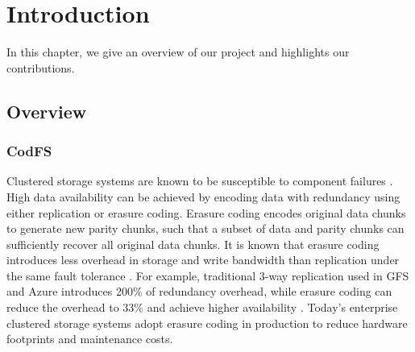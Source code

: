 \chapter{Introduction}
\label{sec:introduction}

In this chapter, we give an overview of our project and highlights our
contributions.

\section{Overview}

\subsection{CodFS}

Clustered storage systems are known to be susceptible to component failures
\cite{ghemawat03}.  High data availability can be achieved by encoding data
with redundancy using either replication or erasure coding.  Erasure coding
encodes original data chunks to generate new parity chunks, such that a subset
of data and parity chunks can sufficiently recover all original data chunks.
It is known that erasure coding introduces less overhead in storage and write
bandwidth than replication under the same fault tolerance
\cite{weatherspoon02,rodrigues05}.  For example, traditional 3-way replication
used in GFS \cite{ghemawat03} and Azure \cite{calder11} introduces 200\% of
redundancy overhead, while erasure coding can reduce the overhead to 33\%
and achieve higher availability \cite{huang12}.  Today's enterprise
clustered storage systems
\cite{welch08,ford10,huang12,sathiamoorthy13,resch11} adopt erasure coding in
production to reduce hardware footprints and maintenance costs.

